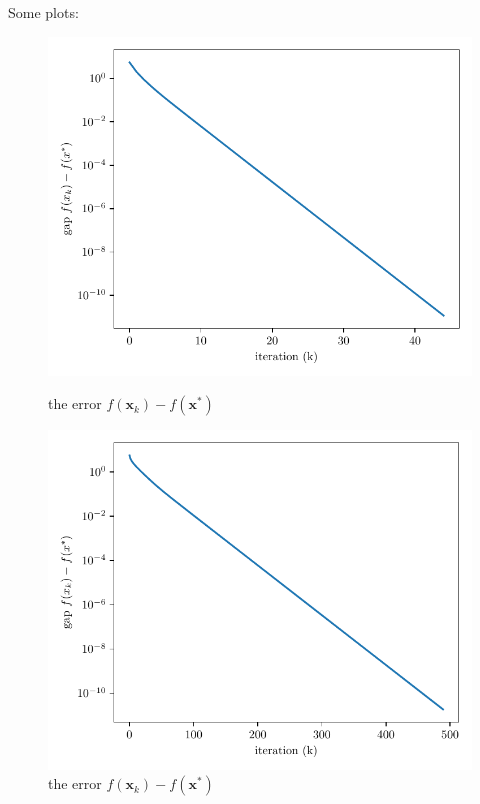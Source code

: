 \documentclass{article}
\def\bx{\boldsymbol{x}}
\begin{document}
\begin{enumerate}[(a)]
		Some plots:
		\begin{figure}[h]
			\centering
			\begin{minipage}[b]{0.46\linewidth}
				\includegraphics[width=1\linewidth]
				{p1bc/gd_error_css0.1.pdf}
				\caption*{the error $f(\bx_k) - f(\bx^*)$}
				\includegraphics[width=1\linewidth]
				{p1bc/gd_error_css0.01.pdf}
				\caption*{the error $f(\bx_k) - f(\bx^*)$}
			\end{minipage}
			\begin{minipage}[b]{0.46\linewidth}

\end{minipage}
\end{figure}
\end{enumerate}
\end{document}
